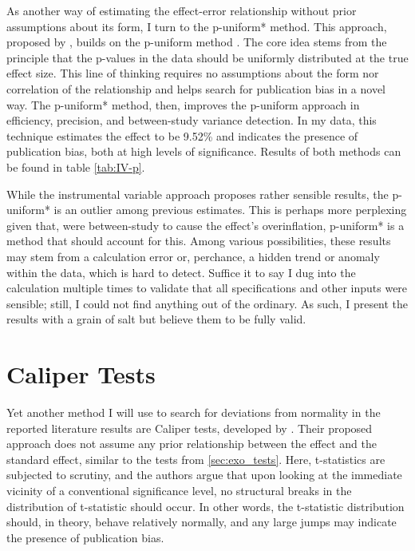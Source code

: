 As another way of estimating the effect-error relationship without prior assumptions about its form, I turn to the p-uniform* method. This approach, proposed by \cite{vanAert2021puni}, builds on the p-uniform method \citep{van2016conducting}. The core idea stems from the principle that the p-values in the data should be uniformly distributed at the true effect size. This line of thinking requires no assumptions about the form nor correlation of the relationship and helps search for publication bias in a novel way. The p-uniform* method, then, improves the p-uniform approach in efficiency, precision, and between-study variance detection. In my data, this technique estimates the effect to be 9.52\% and indicates the presence of publication bias, both at high levels of significance. Results of both methods can be found in table \autoref{tab:IV-p}.

While the instrumental variable approach proposes rather sensible results, the p-uniform* is an outlier among previous estimates. This is perhaps more perplexing given that, were between-study to cause the effect's overinflation, p-uniform* is a method that should account for this. Among various possibilities, these results may stem from a calculation error or, perchance, a hidden trend or anomaly within the data, which is hard to detect. Suffice it to say I dug into the calculation multiple times to validate that all specifications and other inputs were sensible; still, I could not find anything out of the ordinary. As such, I present the results with a grain of salt but believe them to be fully valid.


\section{Caliper Tests}
\label{sec:caliper}

Yet another method I will use to search for deviations from normality in the reported literature results are Caliper tests, developed by \cite{gerber2008caliper}. Their proposed approach does not assume any prior relationship between the effect and the standard effect, similar to the tests from \autoref{sec:exo_tests}. Here, t-statistics are subjected to scrutiny, and the authors argue that upon looking at the immediate vicinity of a conventional significance level, no structural breaks in the distribution of t-statistic should occur. In other words, the t-statistic distribution should, in theory, behave relatively normally, and any large jumps may indicate the presence of publication bias.

